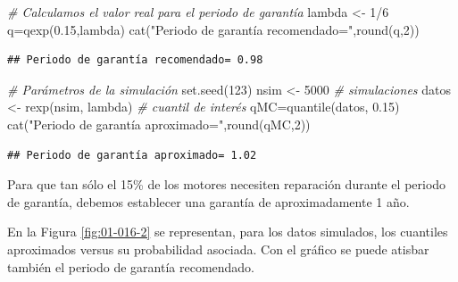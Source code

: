 \documentclass[
]{book}
\newenvironment{Shaded}{\begin{snugshade}}{\end{snugshade}}
\newcommand{\CommentTok}[1]{\textcolor[rgb]{0.56,0.35,0.01}{\textit{#1}}}
\newcommand{\DecValTok}[1]{\textcolor[rgb]{0.00,0.00,0.81}{#1}}
\newcommand{\FloatTok}[1]{\textcolor[rgb]{0.00,0.00,0.81}{#1}}
\newcommand{\FunctionTok}[1]{\textcolor[rgb]{0.00,0.00,0.00}{#1}}
\newcommand{\NormalTok}[1]{#1}
\newcommand{\OtherTok}[1]{\textcolor[rgb]{0.56,0.35,0.01}{#1}}
\newcommand{\SpecialCharTok}[1]{\textcolor[rgb]{0.00,0.00,0.00}{#1}}
\newcommand{\StringTok}[1]{\textcolor[rgb]{0.31,0.60,0.02}{#1}}
\theoremstyle{definition}
\theoremstyle{definition}
\theoremstyle{definition}
\theoremstyle{definition}
\theoremstyle{remark}
\begin{document}
\begin{Shaded}
\begin{Highlighting}[]
\CommentTok{\# Calculamos el valor real para el periodo de garantía}
\NormalTok{lambda }\OtherTok{\textless{}{-}} \DecValTok{1}\SpecialCharTok{/}\DecValTok{6}
\NormalTok{q}\OtherTok{=}\FunctionTok{qexp}\NormalTok{(}\FloatTok{0.15}\NormalTok{,lambda)}
\FunctionTok{cat}\NormalTok{(}\StringTok{"Periodo de garantía recomendado="}\NormalTok{,}\FunctionTok{round}\NormalTok{(q,}\DecValTok{2}\NormalTok{))}
\end{Highlighting}
\end{Shaded}

\begin{verbatim}
## Periodo de garantía recomendado= 0.98
\end{verbatim}

\begin{Shaded}
\begin{Highlighting}[]
\CommentTok{\# Parámetros de la simulación}
\FunctionTok{set.seed}\NormalTok{(}\DecValTok{123}\NormalTok{)}
\NormalTok{nsim }\OtherTok{\textless{}{-}} \DecValTok{5000}
\CommentTok{\# simulaciones}
\NormalTok{datos }\OtherTok{\textless{}{-}} \FunctionTok{rexp}\NormalTok{(nsim, lambda)}
\CommentTok{\# cuantil de interés}
\NormalTok{qMC}\OtherTok{=}\FunctionTok{quantile}\NormalTok{(datos, }\FloatTok{0.15}\NormalTok{)}
\FunctionTok{cat}\NormalTok{(}\StringTok{"Periodo de garantía aproximado="}\NormalTok{,}\FunctionTok{round}\NormalTok{(qMC,}\DecValTok{2}\NormalTok{))}
\end{Highlighting}
\end{Shaded}

\begin{verbatim}
## Periodo de garantía aproximado= 1.02
\end{verbatim}

Para que tan sólo el 15\% de los motores necesiten reparación durante el periodo de garantía, debemos establecer una garantía de aproximadamente 1 año.

En la Figura \ref{fig:01-016-2} se representan, para los datos simulados, los cuantiles aproximados versus su probabilidad asociada. Con el gráfico se puede atisbar también el periodo de garantía recomendado.
\end{document}
